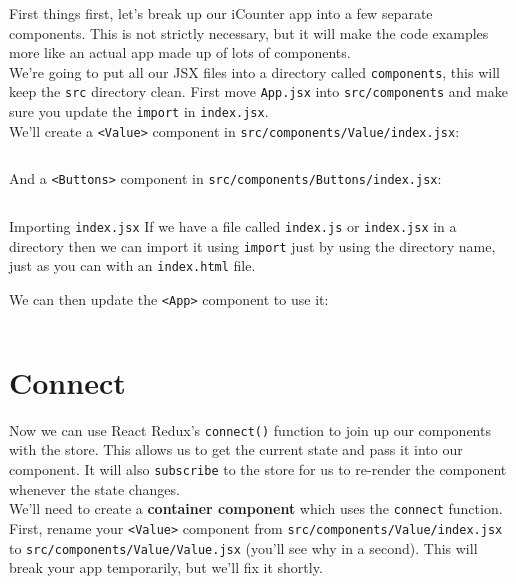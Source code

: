 First things first, let's break up our iCounter app into a few separate components. This is not strictly necessary, but it will make the code examples more like an actual app made up of lots of components.
\\

We're going to put all our JSX files into a directory called \texttt{components}, this will keep the \texttt{src} directory clean. First move \texttt{App.jsx} into \texttt{src/components} and make sure you update the \texttt{import} in \texttt{index.jsx}.
\\

We'll create a \texttt{<Value>} component in \texttt{src/components/Value/index.jsx}:

\inputminted{jsx}{02/figures/02/01-Value.jsx}

And a \texttt{<Buttons>} component in \texttt{src/components/Buttons/index.jsx}:

\inputminted{jsx}{02/figures/02/02-Buttons.jsx}


\begin{infobox}{Importing \texttt{index.jsx}}
    If we have a file called \texttt{index.js} or \texttt{index.jsx} in a directory then we can import it using \texttt{import} just by using the directory name, just as you can with an \texttt{index.html} file.
\end{infobox}

We can then update the \texttt{<App>} component to use it:

\inputminted{jsx}{02/figures/02/03-App.jsx}



\section{Connect}

Now we can use React Redux's \texttt{connect()} function to join up our components with the store. This allows us to get the current state and pass it into our component. It will also \texttt{subscribe} to the store for us to re-render the component whenever the state changes.
\\

We'll need to create a \textbf{container component} which uses the \texttt{connect} function.
\\

First, rename your \texttt{<Value>} component from \texttt{src/components/Value/index.jsx} to \texttt{src/components/Value/Value.jsx} (you'll see why in a second). This will break your app temporarily, but we'll fix it shortly.
\\

